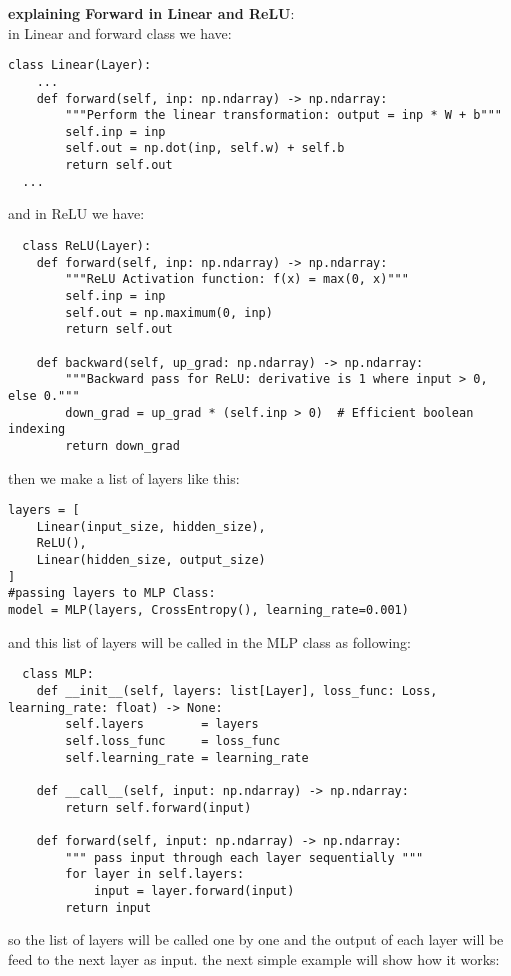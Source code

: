 \documentclass{article}
\newenvironment{cheatformula}[1][כותרת]{
    \begin{minipage}{\linewidth}
    \textbf{#1}: \\
}{
    \end{minipage}\\[0ex]
}
\begin{document}
\begin{cheatformula}[explaining Forward in Linear and ReLU]
in Linear and forward class we have:
\begin{lstlisting}
class Linear(Layer):
    ...
    def forward(self, inp: np.ndarray) -> np.ndarray:
        """Perform the linear transformation: output = inp * W + b"""
        self.inp = inp
        self.out = np.dot(inp, self.w) + self.b
        return self.out
  ...
\end{lstlisting}
and in ReLU we have:
\begin{lstlisting}
  class ReLU(Layer):
    def forward(self, inp: np.ndarray) -> np.ndarray:
        """ReLU Activation function: f(x) = max(0, x)"""
        self.inp = inp
        self.out = np.maximum(0, inp)
        return self.out
    
    def backward(self, up_grad: np.ndarray) -> np.ndarray:
        """Backward pass for ReLU: derivative is 1 where input > 0, else 0."""
        down_grad = up_grad * (self.inp > 0)  # Efficient boolean indexing
        return down_grad

\end{lstlisting}
then we make a list of layers like this:
\begin{lstlisting}
layers = [
    Linear(input_size, hidden_size),
    ReLU(),
    Linear(hidden_size, output_size)
]
#passing layers to MLP Class:
model = MLP(layers, CrossEntropy(), learning_rate=0.001) 
\end{lstlisting}
and this list of layers will be called in the MLP class as following:
\begin{lstlisting}
  class MLP:
    def __init__(self, layers: list[Layer], loss_func: Loss, learning_rate: float) -> None:
        self.layers        = layers
        self.loss_func     = loss_func
        self.learning_rate = learning_rate
    
    def __call__(self, input: np.ndarray) -> np.ndarray:
        return self.forward(input)
    
    def forward(self, input: np.ndarray) -> np.ndarray:
        """ pass input through each layer sequentially """
        for layer in self.layers:
            input = layer.forward(input)
        return input
\end{lstlisting}
so the list of layers will be called one by one and the output of each layer will be feed to
the next layer as input. the next simple example will show how it works:
\end{cheatformula}
\end{document}
